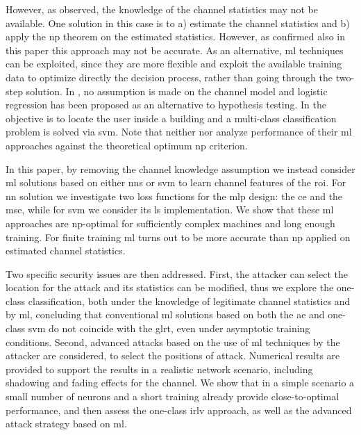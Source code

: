 \documentclass[draftcls,onecolumn,12pt]{IEEEtran}
\begin{document}
However, as observed, the knowledge of the channel statistics may not be available. One solution in this case is to a) estimate the channel statistics and b) apply the \ac{np} theorem on the estimated statistics. However, as confirmed also in this paper this approach may not be accurate. As an alternative, \ac{ml} techniques  can be exploited, since they are more flexible and exploit the available training data to optimize directly the decision process, rather than going through the two-step solution. In  \cite{xiao-2018}, no assumption is made on the channel model and logistic regression has been proposed as an alternative to hypothesis testing. In \cite{tian2015robust} the objective is to locate the user inside a building and a multi-class classification problem is solved via \ac{svm}. Note that neither  \cite{xiao-2018}  nor \cite{tian2015robust} analyze performance of their \ac{ml} approaches against the theoretical optimum \ac{np} criterion.

In this paper, by removing the channel knowledge assumption we instead consider \ac{ml} solutions based on either \acp{nn} or \ac{svm} to learn channel features of the \ac{roi}. For \ac{nn} solution we investigate two loss functions for the \ac{mlp} design: the \ac{ce} and the \ac{mse}, while for \ac{svm} we consider its \ac{ls} implementation.  We show that these \ac{ml} approaches are \ac{np}-optimal for sufficiently complex machines and long enough training. For finite training \ac{ml} turns out to be more accurate than \ac{np} applied on estimated channel statistics. 

Two specific security issues are then addressed. First, the attacker can select the location for the attack and its statistics can be modified, thus we explore the one-class classification, both under the knowledge of legitimate channel statistics and by \ac{ml}, concluding that conventional \ac{ml} solutions based on both the \ac{ae} and one-class \ac{svm} do not coincide with the \ac{glrt}, even under asymptotic training  conditions. Second, advanced attacks based on the use of \ac{ml} techniques by the attacker are considered, to select the positions of attack. Numerical results are provided to support the results in a realistic network scenario, including shadowing and fading effects for the channel. We show that in a simple scenario a small number of neurons and a short training already provide close-to-optimal performance, and then assess the one-class \ac{irlv} approach, as well as the advanced attack strategy based on \ac{ml}.
\end{document}
